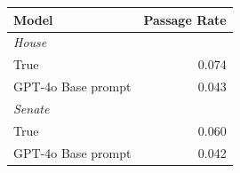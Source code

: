 
\begin{tabular}{lr}
\toprule
Model & Passage Rate\\
\midrule
\multicolumn{2}{l}{\textit{House}}\\
\hspace{1em}True & 0.074\\
\hspace{1em}GPT-4o Base prompt & 0.043\\
\midrule
\multicolumn{2}{l}{\textit{Senate}}\\
\hspace{1em}True & 0.060\\
\hspace{1em}GPT-4o Base prompt & 0.042\\
\bottomrule
\end{tabular}
